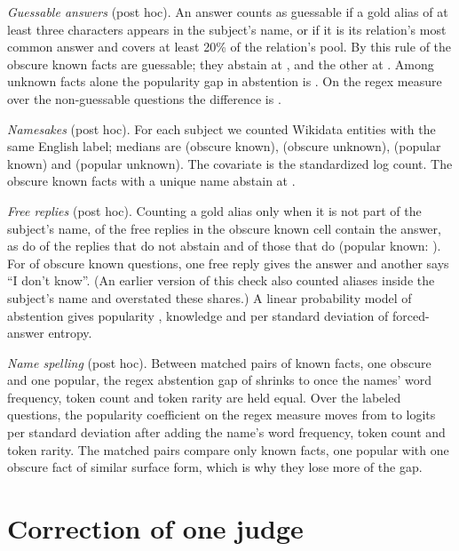 \documentclass{article}
\newcommand{\idk}{``I don't know''}
\begin{document}
\emph{Guessable answers} (post hoc). An answer counts as guessable if a gold alias of at least three characters appears in the subject's name, or if it is its relation's most common answer and covers at least 20\% of the relation's pool. By this rule \rcGuessN{} of the \gsObsKnownTotal{} obscure known facts are guessable; they abstain at \rcGuessAbs, and the other \rcNonGuessN{} at \rcNonGuessAbs. Among unknown facts alone the popularity gap in abstention is \hmLlamaPopUnkOnly{} \hmLlamaPopUnkOnlyCI. On the regex measure over the \gsRegexN{} non-guessable questions the difference is \gsRegexDiff{} \gsRegexDiffCI.

\emph{Namesakes} (post hoc). For each subject we counted Wikidata entities with the same English label; medians are \amObsKnownHom{} (obscure known), \amObsUnkHom{} (obscure unknown), \amPopKnownHom{} (popular known) and \amPopUnkHom{} (popular unknown). The covariate is the standardized log count. The \amSingleN{} obscure known facts with a unique name abstain at \amSingle.

\emph{Free replies} (post hoc). Counting a gold alias only when it is not part of the subject's name, \ecAll{} of the free replies in the obscure known cell contain the answer, as do \ecNonAbs{} of the replies that do not abstain and \ecAbs{} of those that do (popular known: \ecPopKnown). For \ecBoth{} of \ecBothOf{} obscure known questions, one free reply gives the answer and another says \idk. (An earlier version of this check also counted aliases inside the subject's name and overstated these shares.) A linear probability model of abstention gives popularity \rcPopEnt{} \rcPopEntCI, knowledge \rcKnowEnt{} \rcKnowEntCI{} and \rcEntCoef{} per standard deviation of forced-answer entropy.

\emph{Name spelling} (post hoc). Between \scPopKnownPairs{} matched pairs of known facts, one obscure and one popular, the regex abstention gap of \scPopKnownGap{} shrinks to \scPopKnownGapSurface{} \scPopKnownGapSurfaceCI{} once the names' word frequency, token count and token rarity are held equal. Over the \faLlamaN{} labeled questions, the popularity coefficient on the regex measure moves from \scPoolPop{} to \scPoolPopSurface{} logits per standard deviation after adding the name's word frequency, token count and token rarity. The matched pairs compare only known facts, one popular with one obscure fact of similar surface form, which is why they lose more of the gap.

\section{Correction of one judge}
\label{app:judge}
\end{document}
